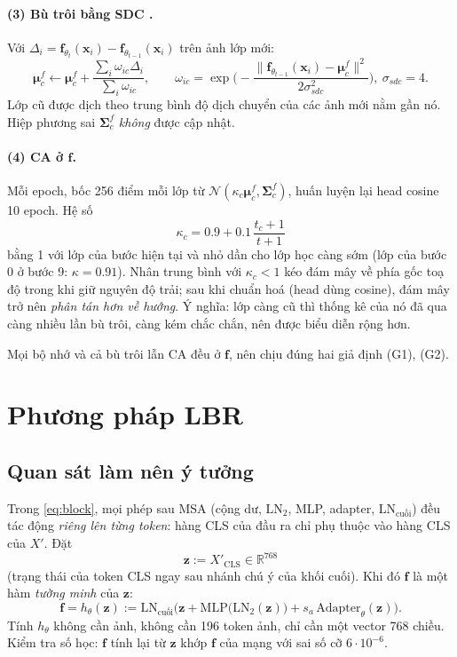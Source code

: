 \documentclass[11pt]{article}
\newcommand{\R}{\mathbb{R}}
\newcommand{\bmu}{\boldsymbol{\mu}}
\newcommand{\bSigma}{\boldsymbol{\Sigma}}
\newcommand{\vf}{\mathbf{f}}
\newcommand{\vx}{\mathbf{x}}
\newcommand{\vz}{\mathbf{z}}
\newcommand{\LN}{\mathrm{LN}}
\begin{document}
\paragraph{(3) Bù trôi bằng SDC \cite{sdc}.} Với $\Delta_i=\vf_{\theta_t}(\vx_i)-\vf_{\theta_{t-1}}(\vx_i)$ trên ảnh lớp
mới:
\begin{equation}\label{eq:sdc}
\bmu^f_c\leftarrow\bmu^f_c+\frac{\sum_i \omega_{ic}\Delta_i}{\sum_i\omega_{ic}},\qquad
\omega_{ic}=\exp\!\Big(-\frac{\|\vf_{\theta_{t-1}}(\vx_i)-\bmu^f_c\|^2}{2\sigma_{sdc}^2}\Big),\ \sigma_{sdc}=4.
\end{equation}
Lớp cũ được dịch theo trung bình độ dịch chuyển của các ảnh mới nằm gần nó. Hiệp phương sai $\bSigma^f_c$ \emph{không}
được cập nhật.

\paragraph{(4) CA ở $\vf$.} Mỗi epoch, bốc 256 điểm mỗi lớp từ $\mathcal N(\kappa_c\bmu^f_c,\bSigma^f_c)$, huấn luyện
lại head cosine 10 epoch. Hệ số
\begin{equation}\label{eq:kappa}
\kappa_c=0.9+0.1\,\frac{t_c+1}{t+1}
\end{equation}
bằng 1 với lớp của bước hiện tại và nhỏ dần cho lớp học càng sớm (lớp của bước 0 ở bước 9: $\kappa=0.91$). Nhân trung
bình với $\kappa_c<1$ kéo đám mây về phía gốc toạ độ trong khi giữ nguyên độ trải; sau khi chuẩn hoá (head dùng cosine),
đám mây trở nên \emph{phân tán hơn về hướng}. Ý nghĩa: lớp càng cũ thì thống kê của nó đã qua càng nhiều lần bù trôi,
càng kém chắc chắn, nên được biểu diễn rộng hơn.

\medskip\noindent Mọi bộ nhớ và cả bù trôi lẫn CA đều ở $\vf$, nên chịu đúng hai giả định (G1), (G2).

\section{Phương pháp LBR}\label{sec:lbr}

\subsection{Quan sát làm nên ý tưởng}\label{sec:obs}
Trong \eqref{eq:block}, mọi phép sau MSA (cộng dư, $\LN_2$, MLP, adapter, $\LN_{\text{cuối}}$) đều tác động \emph{riêng
lên từng token}: hàng CLS của đầu ra chỉ phụ thuộc vào hàng CLS của $X'$. Đặt
\begin{equation}\label{eq:z}
\vz:=X'_{\text{CLS}}\in\R^{768}
\end{equation}
(trạng thái của token CLS ngay sau nhánh chú ý của khối cuối). Khi đó $\vf$ là một hàm \emph{tường minh} của $\vz$:
\begin{equation}\label{eq:h}
\vf=h_\theta(\vz):=\LN_{\text{cuối}}\Big(\vz+\mathrm{MLP}\big(\LN_2(\vz)\big)+s_a\,\mathrm{Adapter}_\theta(\vz)\Big).
\end{equation}
Tính $h_\theta$ không cần ảnh, không cần 196 token ảnh, chỉ cần một vector 768 chiều. Kiểm tra số học: $\vf$ tính lại từ
$\vz$ khớp $\vf$ của mạng với sai số cỡ $6\cdot10^{-6}$.
\end{document}
